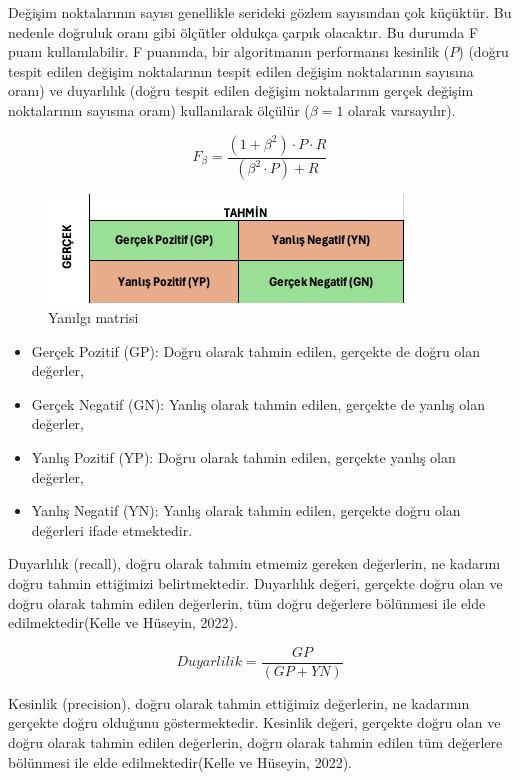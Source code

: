 \documentclass[12pt,twoside]{deuthesis}
\providecommand{\tightlist}{%
  \setlength{\itemsep}{0pt}\setlength{\parskip}{0pt}}
\begin{document}
Değişim noktalarının sayısı genellikle serideki gözlem sayısından çok küçüktür. Bu nedenle doğruluk oranı gibi ölçütler oldukça çarpık olacaktır. Bu durumda F puanı kullanılabilir. F puanında, bir algoritmanın performansı kesinlik (\(P\)) (doğru tespit edilen değişim noktalarının tespit edilen değişim noktalarının sayısına oranı) ve duyarlılık (doğru tespit edilen değişim noktalarının gerçek değişim noktalarının sayısına oranı) kullanılarak ölçülür (\(\beta = 1\) olarak varsayılır).

\[F_{\beta} = \frac{(1 + \beta^2) \cdot P \cdot R}{(\beta^2 \cdot P) + R}\]

\begin{figure}
\includegraphics[width=357px,height=109px]{figure/conmat} \caption{Yanılgı matrisi}\label{fig:unnamed-chunk-2}
\end{figure}

\begin{itemize}
\tightlist
\item
  Gerçek Pozitif (GP): Doğru olarak tahmin edilen, gerçekte de doğru olan değerler,
\item
  Gerçek Negatif (GN): Yanlış olarak tahmin edilen, gerçekte de yanlış olan değerler,
\item
  Yanlış Pozitif (YP): Doğru olarak tahmin edilen, gerçekte yanlış olan değerler,
\item
  Yanlış Negatif (YN): Yanlış olarak tahmin edilen, gerçekte doğru olan değerleri ifade etmektedir.
\end{itemize}

Duyarlılık (recall), doğru olarak tahmin etmemiz gereken değerlerin, ne kadarını doğru tahmin ettiğimizi belirtmektedir. Duyarlılık değeri, gerçekte doğru olan ve doğru olarak tahmin edilen değerlerin, tüm doğru değerlere bölünmesi ile elde edilmektedir(Kelle ve Hüseyin, 2022).

\[Duyarlilik =  \frac{GP}{(GP + YN)}\]

Kesinlik (precision), doğru olarak tahmin ettiğimiz değerlerin, ne kadarının gerçekte doğru olduğunu göstermektedir. Kesinlik değeri, gerçekte doğru olan ve doğru olarak tahmin edilen değerlerin, doğru olarak tahmin edilen tüm değerlere bölünmesi ile elde edilmektedir(Kelle ve Hüseyin, 2022).
\end{document}
